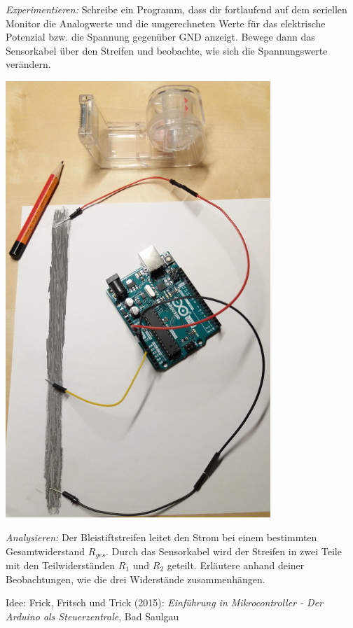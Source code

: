 \begin{aufgabe}
\begin{minipage}{0.6\textwidth}
		\smallskip
		\emph{Experimentieren:}	Schreibe ein Programm, dass dir fortlaufend auf dem seriellen Monitor die Analogwerte und die umgerechneten Werte für das elektrische Potenzial bzw. die Spannung gegenüber GND anzeigt. Bewege dann das Sensorkabel über den Streifen und beobachte, wie sich die Spannungswerte verändern.
	\end{minipage}
	\hfill
	\begin{minipage}{0.39\textwidth}
		\centering
		\includegraphics[width=0.75\textwidth]{./pics/bleistiftpoti-klein.png}
	\end{minipage}

	\medskip
	\emph{Analysieren:}	Der Bleistiftstreifen leitet den Strom bei einem bestimmten Gesamtwiderstand $R_{ges}$. Durch das Sensorkabel wird der Streifen in zwei Teile mit den Teilwiderständen $R_1$ und $R_2$ geteilt. Erläutere anhand deiner Beobachtungen, wie die drei Widerstände zusammenhängen.
	
	{\scriptsize Idee: Frick, Fritsch und Trick (2015): \emph{Einführung in Mikrocontroller - Der Arduino als Steuerzentrale}, Bad Saulgau}
\end{aufgabe}

